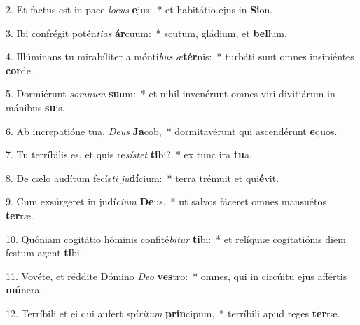 2. Et factus est in pace \textit{lo}\textit{cus} \textbf{e}jus:~*  et habitátio ejus in \textbf{Si}on.\

3. Ibi confrégit potén\textit{ti}\textit{as} \textbf{ár}cuum:~*  scutum, gládium, et \textbf{bel}lum.\

4. Illúminans tu mirabíliter a mónti\textit{bus} \textit{æ}\textbf{tér}nis:~*  turbáti sunt omnes insipiéntes \textbf{cor}de.\

5. Dormiérunt \textit{som}\textit{num} \textbf{su}um:~*  et nihil invenérunt omnes viri divitiárum in mánibus \textbf{su}is.\

6. Ab increpatióne tua, \textit{De}\textit{us} \textbf{Ja}cob,~*  dormitavérunt qui ascendérunt \textbf{e}quos.\

7. Tu terríbilis es, et quis re\textit{sís}\textit{tet} \textbf{ti}bi?~*  ex tunc ira \textbf{tu}a.\

8. De cælo audítum fecís\textit{ti} \textit{ju}\textbf{dí}cium:~*  terra trémuit et qui\textbf{é}vit.\

9. Cum exsúrgeret in judí\textit{ci}\textit{um} \textbf{De}us,~*  ut salvos fáceret omnes mansuétos \textbf{ter}ræ.\

10. Quóniam cogitátio hóminis confité\textit{bi}\textit{tur} \textbf{ti}bi:~*  et relíquiæ cogitatiónis diem festum agent \textbf{ti}bi.\

11. Vovéte, et réddite Dómino \textit{De}\textit{o} \textbf{ves}tro:~*  omnes, qui in circúitu ejus affértis \textbf{mú}nera.\

12. Terríbili et ei qui aufert spí\textit{ri}\textit{tum} \textbf{prín}cipum,~*  terríbili apud reges \textbf{ter}ræ.\

